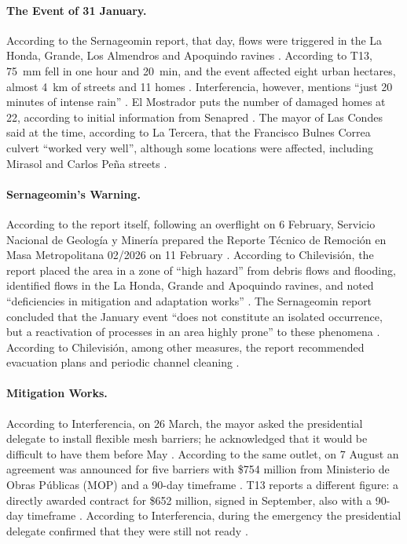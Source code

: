 \paragraph{The Event of 31 January.} According to the Sernageomin report, that day, flows were triggered in the La Honda, Grande, Los Almendros and Apoquindo ravines \citep{sernageomin2026reterm}. According to T13, \SI{75}{mm} fell in one hour and \SI{20}{min}, and the event affected eight urban hectares, almost \SI{4}{km} of streets and 11 homes \citep{t13_2026mallas}. Interferencia, however, mentions ``just 20 minutes of intense rain'' \citep{interferencia2026}. El Mostrador puts the number of damaged homes at 22, according to initial information from Senapred \citep{elmostrador2026}. The mayor of Las Condes said at the time, according to La Tercera, that the Francisco Bulnes Correa culvert ``worked very well'', although some locations were affected, including Mirasol and Carlos Peña streets \citep{latercera2026enero}.

\paragraph{Sernageomin's Warning.} According to the report itself, following an overflight on 6 February, Servicio Nacional de Geología y Minería prepared the Reporte Técnico de Remoción en Masa Metropolitana 02/2026 on 11 February \citep{sernageomin2026reterm}. According to Chilevisión, the report placed the area in a zone of ``high hazard'' from debris flows and flooding, identified flows in the La Honda, Grande and Apoquindo ravines, and noted ``deficiencies in mitigation and adaptation works'' \citep{chilevision2026}. The Sernageomin report concluded that the January event ``does not constitute an isolated occurrence, but a reactivation of processes in an area highly prone'' to these phenomena \citep{sernageomin2026reterm}. According to Chilevisión, among other measures, the report recommended evacuation plans and periodic channel cleaning \citep{chilevision2026}.

\paragraph{Mitigation Works.} According to Interferencia, on 26 March, the mayor asked the presidential delegate to install flexible mesh barriers; he acknowledged that it would be difficult to have them before May \citep{interferencia2026}. According to the same outlet, on 7 August an agreement was announced for five barriers with \$754 million from Ministerio de Obras Públicas (MOP) and a 90-day timeframe \citep{interferencia2026}. T13 reports a different figure: a directly awarded contract for \$652 million, signed in September, also with a 90-day timeframe \citep{t13_2026mallas}. According to Interferencia, during the emergency the presidential delegate confirmed that they were still not ready \citep{interferencia2026}.

